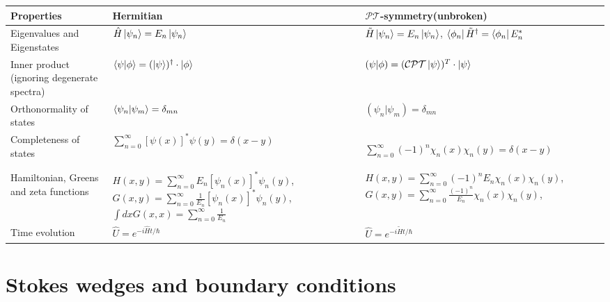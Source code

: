 \documentclass[12pt, a4paper]{report}
\newcommand\PT{\(\mathcal{PT}\)}
\begin{document}
{\renewcommand{\arraystretch}{2}
\noindent\begin{tabularx}{1.1\textwidth} { 
  | >{\raggedright\arraybackslash}X 
  | >{\raggedright\arraybackslash}X 
  | >{\raggedright\arraybackslash}X | }
 \hline
  \textbf{Properties} 
  & \textbf{Hermitian} 
  & \textbf{\PT-symmetry}\newline \small{(unbroken)} \\
   \hline
  Eigenvalues \newline and Eigenstates
  & $\hat{H}\ket{\psi_n} = E_n \ket{\psi_n}$ 
  & $\tilde{H}\ket{\psi_n} = E_n \ket{\psi_n}$, $\bra{\phi_n}\tilde{H}^{\dagger} = \bra{\phi_n}E_{n}^{*}$\vspace{0.001cm} \\
  \hline
  Inner product \newline \tiny{(ignoring degenerate spectra)}
  & $\braket{\psi|\phi} = (\ket{\psi})^{\dagger} \cdot \ket{\phi}$
  & $\left(\psi|\phi\right) = (\mathcal{CPT}\ket{\psi})^{T} \cdot \ket{\psi}$ \\
  \hline
  Orthonormality of states 
  & $\braket{\psi_n|\psi_m} = \delta_{mn}$ 
  & $\left(\psi_n|\psi_m\right) = \delta_{mn}$\\
  \hline
  Completeness of states 
  & $\sum\limits_{n = 0}^{\infty} [\psi(x)]^{*} \psi(y) = \delta(x-y)$
  & \begin{small}{$\sum\limits_{n = 0}^{\infty} (-1)^{n} \chi_n(x) \chi_n(y) = \delta(x-y)$}\end{small}\\
  \hline
  Hamiltonian, Greens \newline and zeta functions 
  & \small{$H(x,y) = \sum\limits_{n = 0}^{\infty} E_n [\psi_n(x)]^{*}\psi_n(y)$, 
  \newline $G(x,y) = \sum\limits_{n = 0}^{\infty} \frac{1}{E_n} [\psi_n(x)]^{*}\psi_n(y)$,
  \newline $\int dx G(x,x) =  \sum\limits_{n = 0}^{\infty} \frac{1}{E_n}$}
  & \small{$H(x,y) = \sum\limits_{n = 0}^{\infty}(-1)^{n} E_n \chi_n(x)\chi_n(y)$, \newline $G(x,y) = \sum\limits_{n = 0}^{\infty} \frac{(-1)^n}{E_n}\chi_n(x)\chi_n(y)$, \newline }\\

  \hline
  Time evolution
  & $\hat{U} = e^{-i\hat{H}t/\hbar}$
  & $\hat{U} = e^{-i\tilde{H}t/\hbar}$\\
  \hline
\end{tabularx}
}


\section*{Stokes wedges and boundary conditions}\label{}





\end{document}

